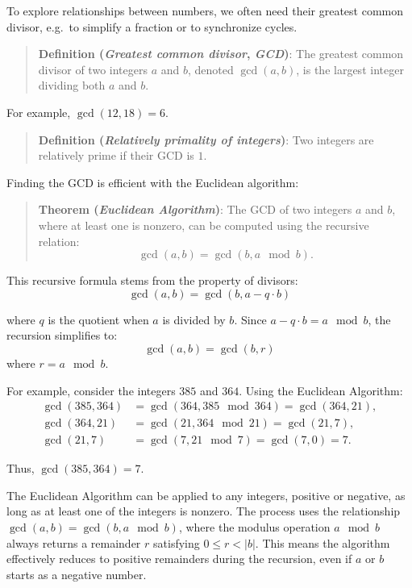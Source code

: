 \documentclass[
  letterpaper,
  DIV=11,
  numbers=noendperiod,
  oneside]{scrartcl}
\begin{document}
To explore relationships between numbers, we often need their greatest
common divisor, e.g.~to simplify a fraction or to synchronize cycles.

\begin{quote}
\textbf{Definition (\emph{Greatest common divisor}, \emph{GCD})}: The
greatest common divisor of two integers \(a\) and \(b\), denoted
\(\gcd(a, b)\), is the largest integer dividing both \(a\) and \(b\).
\end{quote}

For example, \(\gcd(12, 18) = 6\).

\begin{quote}
\textbf{Definition (\emph{Relatively primality of integers})}: Two
integers are relatively prime if their GCD is \(1\).
\end{quote}

Finding the GCD is efficient with the Euclidean algorithm:

\begin{quote}
\textbf{Theorem (\emph{Euclidean Algorithm})}: The GCD of two integers
\(a\) and \(b\), where at least one is nonzero, can be computed using
the recursive relation: \[
\gcd(a, b) = \gcd(b, a \mod b).
\]
\end{quote}

This recursive formula stems from the property of divisors: \[
\gcd(a, b) = \gcd(b, a - q \cdot b)
\]

where \(q\) is the quotient when \(a\) is divided by \(b\). Since
\(a - q \cdot b = a \mod b\), the recursion simplifies to: \[
\gcd(a, b) = \gcd(b, r)
\] where \(r = a \mod b\).

For example, consider the integers \(385\) and \(364\). Using the
Euclidean Algorithm: \[
\begin{aligned}
\gcd(385, 364) &= \gcd(364, 385 \mod 364) = \gcd(364, 21), \\
\gcd(364, 21) &= \gcd(21, 364 \mod 21) = \gcd(21, 7), \\
\gcd(21, 7) &= \gcd(7, 21 \mod 7) = \gcd(7, 0) = 7.
\end{aligned}
\]

Thus, \(\gcd(385, 364) = 7\).

The Euclidean Algorithm can be applied to any integers, positive or
negative, as long as at least one of the integers is nonzero. The
process uses the relationship \(\gcd(a, b) = \gcd(b, a \mod b)\), where
the modulus operation \(a \mod b\) always returns a remainder \(r\)
satisfying \(0 \leq r < |b|\). This means the algorithm effectively
reduces to positive remainders during the recursion, even if \(a\) or
\(b\) starts as a negative number.
\end{document}
